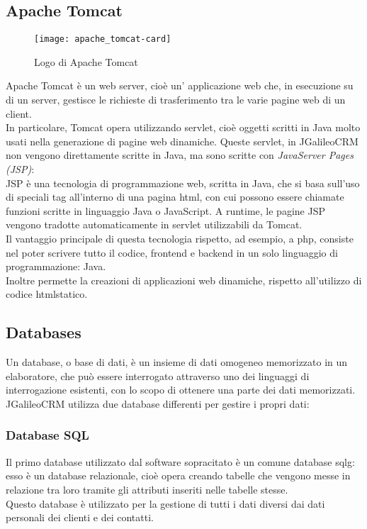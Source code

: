\subsection{Apache Tomcat}
\begin{figure}[h]
	\centering
	\texttt{[image: apache\_tomcat-card]}
	\caption{Logo di Apache Tomcat}
\end{figure}
Apache Tomcat è un web server, cioè un' applicazione web che, in esecuzione su di un server, gestisce le richieste di trasferimento tra le varie pagine web di un client.\\
In particolare, Tomcat opera utilizzando \gls{servlet}\glsfirstoccur, cioè oggetti scritti in Java molto usati nella generazione di pagine web dinamiche.
Queste \gls{servlet}, in JGalileoCRM non vengono direttamente scritte in Java, ma sono scritte con \emph{JavaServer Pages (JSP)}:\\
JSP è una tecnologia di programmazione web, scritta in Java, che si basa sull'uso di speciali tag all'interno di una pagina \gls{html}, con cui possono essere chiamate funzioni scritte in linguaggio Java o JavaScript.
A runtime, le pagine JSP vengono tradotte automaticamente in \gls{servlet} utilizzabili da Tomcat. \\
Il vantaggio principale di questa tecnologia rispetto, ad esempio, a \gls{php}\glsfirstoccur, consiste nel poter scrivere tutto il codice, frontend e backend in un solo linguaggio di programmazione: Java. \\
Inoltre permette la creazioni di applicazioni web dinamiche, rispetto all'utilizzo di codice \gls{html}\glsfirstoccur statico.
\subsection{Databases}
Un database, o base di dati, è un insieme di dati omogeneo memorizzato in un elaboratore, che può essere interrogato attraverso uno dei linguaggi di interrogazione esistenti, con lo scopo di ottenere una parte dei dati memorizzati.\\
JGalileoCRM utilizza due database differenti per gestire i propri dati:
\subsubsection{Database SQL}
Il primo database utilizzato dal software sopracitato è un comune database \gls{sqlg}\glsfirstoccur: esso è un database relazionale, cioè opera creando tabelle che vengono messe in relazione tra loro tramite gli attributi inseriti nelle tabelle stesse.\\
Questo database è utilizzato per la gestione di tutti i dati diversi dai dati personali dei clienti e dei contatti. %
